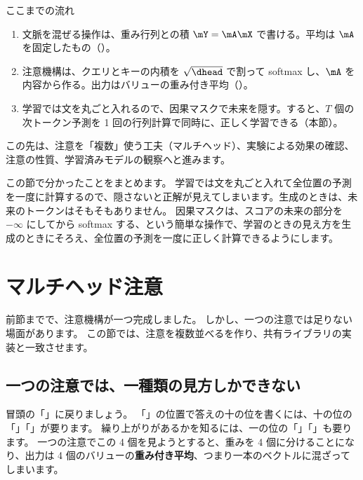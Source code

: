 \begin{intuition}{ここまでの流れ}
\begin{enumerate}[leftmargin=1.5em]
\item 文脈を混ぜる操作は、重み行列との積 $\mY=\mA\mX$ で書ける。平均は $\mA$ を固定したもの（）。
\item 注意機構は、クエリとキーの内積を $\sqrt{\dhead}$ で割って softmax し、$\mA$ を内容から作る。出力はバリューの重み付き平均（）。
\item 学習では文を丸ごと入れるので、因果マスクで未来を隠す。すると、$T$ 個の次トークン予測を 1 回の行列計算で同時に、正しく学習できる（本節）。
\end{enumerate}
この先は、注意を「複数」使う工夫（マルチヘッド）、実験による効果の確認、注意の性質、学習済みモデルの観察へと進みます。
\end{intuition}

この節で分かったことをまとめます。
学習では文を丸ごと入れて全位置の予測を一度に計算するので、隠さないと正解が見えてしまいます。生成のときは、未来のトークンはそもそもありません。
因果マスクは、スコアの未来の部分を $-\infty$ にしてから softmax する、という簡単な操作で、学習のときの見え方を生成のときにそろえ、全位置の予測を一度に正しく計算できるようにします。

\section{マルチヘッド注意}\label{sec:attn-multihead}

前節までで、注意機構が一つ完成しました。
しかし、一つの注意では足りない場面があります。
この節では、注意を複数並べるを作り、共有ライブラリの実装と一致させます。

\subsection*{一つの注意では、一種類の見方しかできない}

冒頭の「」に戻りましょう。
「\code{=}」の位置で答えの十の位を書くには、十の位の「」「」が要ります。
繰り上がりがあるかを知るには、一の位の「」「」も要ります。
一つの注意でこの 4 個を見ようとすると、重みを 4 個に分けることになり、出力は 4 個のバリューの\textbf{重み付き平均}、つまり一本のベクトルに混ざってしまいます。

